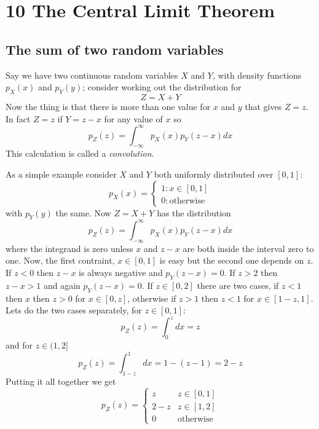 \documentclass[11pt,a4paper]{scrartcl}
\begin{document}
\section*{10 The Central Limit Theorem}

\subsection*{The sum of two random variables}

Say we have two continuous random variables $X$ and $Y$, with density
functions $p_X(x)$ and $p_Y(y)$; consider working out the distribution for 
\begin{equation}
Z=X+Y
\end{equation}
Now the thing is that there is more than one value for $x$ and $y$
that gives $Z=z$. In fact $Z=z$ if $Y=z-x$ for any value of $x$ so
\begin{equation}
p_Z(z)=\int_{-\infty}^\infty {p_X(x)p_Y(z-x)dx}
\end{equation}
This calculation is called a \textsl{convolution}.

As a simple example consider $X$ and $Y$ both uniformly distributed
over $[0,1]$:
\begin{equation}
p_X(x)=\left\{\begin{array}{ll}1:x\in[0,1]\\0:\mbox{otherwise}\end{array}\right.
\end{equation}
with $p_Y(y)$ the same. Now $Z=X+Y$ has the distribution
\begin{equation}
p_Z(z)=\int_{-\infty}^\infty {p_X(x)p_Y(z-x)dx}
\end{equation}
where the integrand is zero unless $x$ and $z-x$ are both inside the
interval zero to one. Now, the first contraint, $x\in [0,1]$ is easy
but the second one depends on $z$. If $z<0$ then $z-x$ is always
negative and $p_Y(z-x)=0$. If $z>2$ then $z-x>1$ and again
$p_Y(z-x)=0$. If $z\in [0,2]$ there are two cases, if $z<1$ then $x$
then $z>0$ for $x\in [0,z]$, otherwise if $z>1$ then $z<1$ for
$x\in [1-z,1]$. Lets do the two cases separately, for $z\in [0,1]$:
\begin{equation}
p_Z(z)=\int_0^z dx=z
\end{equation}
and for $z\in (1,2]$
\begin{equation}
p_Z(z)=\int_{1-z}^1dx=1-(z-1)=2-z
\end{equation}
Putting it all together we get
\begin{equation}
p_Z(z)=\left\{\begin{array}{ll} z&z\in [0,1]\\2-z& z\in [1,2]\\0&\mbox{otherwise}\end{array}\right.
\end{equation}
\end{document}

